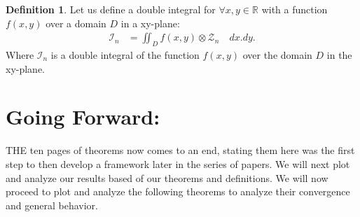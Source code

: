 \documentclass[10pt]{article}
\theoremstyle{plain}
\theoremstyle{definition}
\newtheorem{definition}[theorem]{Definition}
\theoremstyle{remark}
\begin{document}
\begin{definition}
	Let us define a double integral for $\forall x, y \in \mathbb{R}$ with a function $f(x, y)$ over a domain $D$ in a xy-plane:
	\begin{align*}
		\mathcal{I}_n &= \iint_{D} f(x, y) \otimes \mathcal{Z}_n \quad dx.dy.
	\end{align*}
	Where $\mathcal{I}_n$ is a double integral of the function $f(x, y)$ over the domain $D$ in the xy-plane.
\end{definition}

\section{Going Forward:}

\lettrine[lines=2, lhang=0.1, loversize=0.2]{T}HE ten pages of theorems now comes to an end, stating them here was the first step to then develop a framework later in the series of papers. We will next plot and analyze our results based of our theorems and definitions. We will now proceed to plot and analyze the following theorems to analyze their convergence and general behavior.

\nocite{*}




\end{document}

